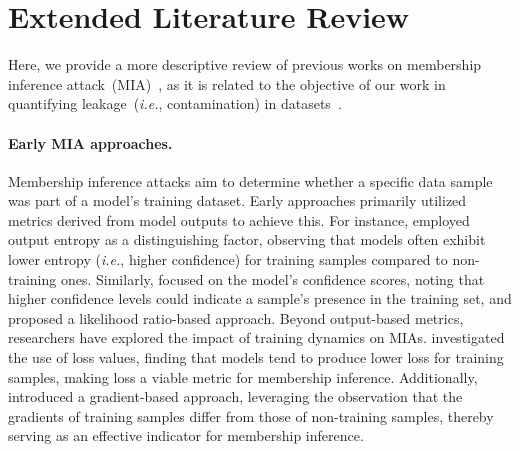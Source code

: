 \section{Extended Literature Review}
\label{apdx:relwork}

Here, we provide a more descriptive review of previous works on membership inference attack~(MIA)~\cite{shokri2017membership,truex2019demystifying}, as it is related to the objective of our work in quantifying leakage~(\textit{i.e.}, contamination) in datasets~\cite{magar2022data,xu2024benchmark,balloccu2024leak}.

\paragraph{Early MIA approaches.} 
Membership inference attacks aim to determine whether a specific data sample was part of a model's training dataset. 
Early approaches primarily utilized metrics derived from model outputs to achieve this. 
For instance, \citet{salem2019ml} employed output entropy as a distinguishing factor, observing that models often exhibit lower entropy (\textit{i.e.}, higher confidence) for training samples compared to non-training ones. 
Similarly, \citet{liu2019socinf} focused on the model's confidence scores, noting that higher confidence levels could indicate a sample's presence in the training set, and \citet{carlini2022membership} proposed a likelihood ratio-based approach.
Beyond output-based metrics, researchers have explored the impact of training dynamics on MIAs. 
\citet{yeom2018privacy} investigated the use of loss values, finding that models tend to produce lower loss for training samples, making loss a viable metric for membership inference.
Additionally, \citet{liu2023gradient} introduced a gradient-based approach, leveraging the observation that the gradients of training samples differ from those of non-training samples, thereby serving as an effective indicator for membership inference.


